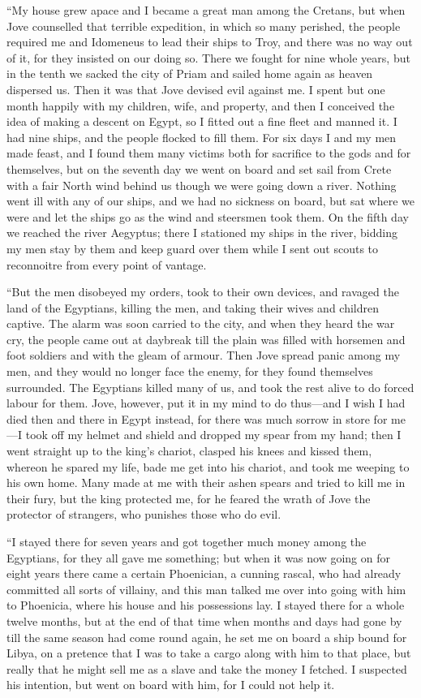 “My house grew apace and I became a great man among the Cretans, but when Jove
counselled that terrible expedition, in which so many perished, the people
required me and Idomeneus to lead their ships to Troy, and there was no way out
of it, for they insisted on our doing so. There we fought for nine whole years,
but in the tenth we sacked the city of Priam and sailed home again as heaven
dispersed us. Then it was that Jove devised evil against me. I spent but one
month happily with my children, wife, and property, and then I conceived the
idea of making a descent on Egypt, so I fitted out a fine fleet and manned it.
I had nine ships, and the people flocked to fill them. For six days I and my
men made feast, and I found them many victims both for sacrifice to the gods
and for themselves, but on the seventh day we went on board and set sail from
Crete with a fair North wind behind us though we were going down a river.
Nothing went ill with any of our ships, and we had no sickness on board, but
sat where we were and let the ships go as the wind and steersmen took them. On
the fifth day we reached the river Aegyptus; there I stationed my ships in the
river, bidding my men stay by them and keep guard over them while I sent out
scouts to reconnoitre from every point of vantage.

“But the men disobeyed my orders, took to their own devices, and ravaged the
land of the Egyptians, killing the men, and taking their wives and children
captive. The alarm was soon carried to the city, and when they heard the war
cry, the people came out at daybreak till the plain was filled with horsemen
and foot soldiers and with the gleam of armour. Then Jove spread panic among my
men, and they would no longer face the enemy, for they found themselves
surrounded. The Egyptians killed many of us, and took the rest alive to do
forced labour for them. Jove, however, put it in my mind to do thus—and I wish
I had died then and there in Egypt instead, for there was much sorrow in store
for me—I took off my helmet and shield and dropped my spear from my hand; then
I went straight up to the king’s chariot, clasped his knees and kissed them,
whereon he spared my life, bade me get into his chariot, and took me weeping to
his own home. Many made at me with their ashen spears and tried to kill me in
their fury, but the king protected me, for he feared the wrath of Jove the
protector of strangers, who punishes those who do evil.

“I stayed there for seven years and got together much money among the
Egyptians, for they all gave me something; but when it was now going on for
eight years there came a certain Phoenician, a cunning rascal, who had already
committed all sorts of villainy, and this man talked me over into going with
him to Phoenicia, where his house and his possessions lay. I stayed there for a
whole twelve months, but at the end of that time when months and days had gone
by till the same season had come round again, he set me on board a ship bound
for Libya, on a pretence that I was to take a cargo along with him to that
place, but really that he might sell me as a slave and take the money I
fetched. I suspected his intention, but went on board with him, for I could not
help it.

